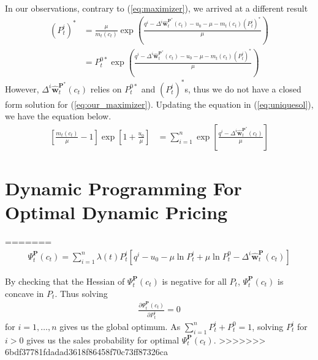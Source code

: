 In our observations, contrary to (\ref{eq:maximizer}), we arrived at a different result
\begin{align}
(P_t^i)^\ast &= \frac{\mu}{m_t(c_t)}\exp \left(\frac{q^i-\Delta^i \hat{\mathbf{w}}_t^{\mathbf{P}^\ast}(c_t)-u_0 - \mu- m_t(c_t)(P_t^i)^\ast}{\mu}\right)\nonumber\\
&= P_t^{0\ast}\exp \left(\frac{q^i-\Delta^i \hat{\mathbf{w}}_t^{\mathbf{P}^\ast}(c_t)-u_0 - \mu - m_t(c_t)(P_t^i)^\ast}{\mu}\right)\label{eq:our_maximizer}
\end{align}
%
However,  $\Delta^i \hat{\mathbf{w}}_t^{\mathbf{P}^\ast}(c_t)$ relies on $P_t^{0\ast}$ and $(P_t^i)^\ast$s, thus we do not have a closed form solution for (\ref{eq:our_maximizer}). Updating the equation in (\ref{eq:uniquesol}), we have the equation below.
\begin{align}
\left[\frac{m_t(c_t)}{\mu}-1\right] \exp \left[1+\frac{u_0}{\mu}\right] &= \sum_{i=1}^{n}\exp \left[\frac{q^i-\Delta^i \hat{\mathbf{w}}_t^{\mathbf{P}^\ast}(c_t)}{\mu}\right]\label{eq:our_uniquesol}
\end{align}








\section{Dynamic Programming For Optimal Dynamic Pricing}

=======
\begin{align}
\Psi_t^{\mathbf{P}}(c_t) = \sum_{i=1}^{n}\lambda(t)P_t^i\left[q^i-u_0-\mu \ln P_t^i + \mu \ln P_t^0- \Delta^i \hat{\mathbf{w}}_t^{\mathbf{P}}(c_t)\right]
\end{align}

By checking that the Hessian of $\Psi_t^{\mathbf{P}}(c_t)$ is negative for all $P_t$, $\Psi_t^{\mathbf{P}}(c_t)$ is concave in $P_t$. Thus solving
\begin{align*}
\frac{\partial \Psi_t^{\mathbf{P}}(c_t)}{\partial P_t^i} = 0 
\end{align*}
for $i=1,\ldots, n$ gives us the global optimum. As $\sum_{i=1}^{n}P_t^i+P_t^0=1$, solving $P_t^i$ for $i>0$ gives us the sales probability for optimal $\Psi_t^{\mathbf{P}}(c_t)$.
>>>>>>> 6bdf37781fdadad3618f86458f70c73ff87326ca

